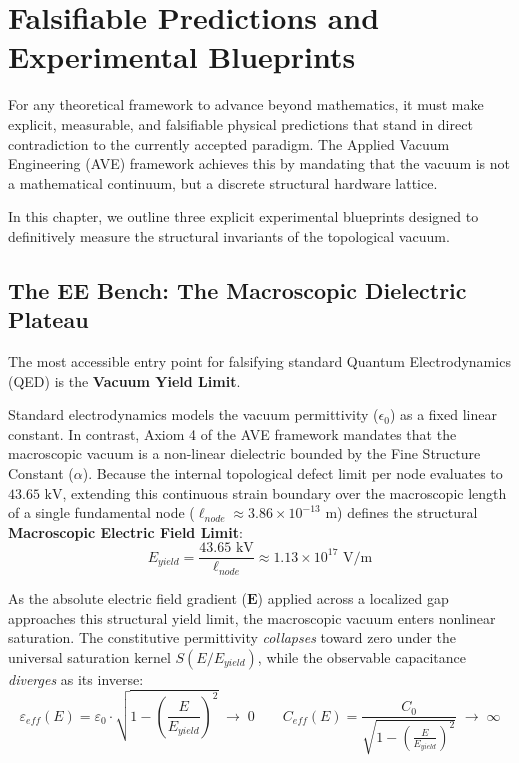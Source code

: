 \chapter{Falsifiable Predictions and Experimental Blueprints}
\label{ch:falsifiable_predictions}

For any theoretical framework to advance beyond mathematics, it must make explicit, measurable, and falsifiable physical predictions that stand in direct contradiction to the currently accepted paradigm. The Applied Vacuum Engineering (AVE) framework achieves this by mandating that the vacuum is not a mathematical continuum, but a discrete structural hardware lattice.

In this chapter, we outline three explicit experimental blueprints designed to definitively measure the structural invariants of the topological vacuum.

\section{The EE Bench: The Macroscopic Dielectric Plateau}
The most accessible entry point for falsifying standard Quantum Electrodynamics (QED) is the \textbf{Vacuum Yield Limit}.

Standard electrodynamics models the vacuum permittivity ($\epsilon_0$) as a fixed linear constant. In contrast, Axiom 4 of the AVE framework mandates that the macroscopic vacuum is a non-linear dielectric bounded by the Fine Structure Constant ($\alpha$). Because the internal topological defect limit per node evaluates to $43.65 \text{ kV}$, extending this continuous strain boundary over the macroscopic length of a single fundamental node ($\ell_{node} \approx 3.86 \times 10^{-13} \text{ m}$) defines the structural \textbf{Macroscopic Electric Field Limit}:
\begin{equation}
    E_{yield} = \frac{43.65 \text{ kV}}{\ell_{node}} \approx 1.13 \times 10^{17} \text{ V/m}
\end{equation}

As the absolute electric field gradient ($\mathbf{E}$) applied across a localized gap approaches this structural yield limit, the macroscopic vacuum enters nonlinear saturation. The constitutive permittivity \emph{collapses} toward zero under the universal saturation kernel $S(E/E_{yield})$, while the observable capacitance \emph{diverges} as its inverse:
\begin{equation}
    \varepsilon_{eff}(E) = \varepsilon_0 \cdot \sqrt{1 - \left(\frac{E}{E_{yield}}\right)^2} \;\to\; 0
    \qquad
    C_{eff}(E) = \frac{C_0}{\sqrt{1 - \left(\frac{E}{E_{yield}}\right)^2}} \;\to\; \infty
\end{equation}

